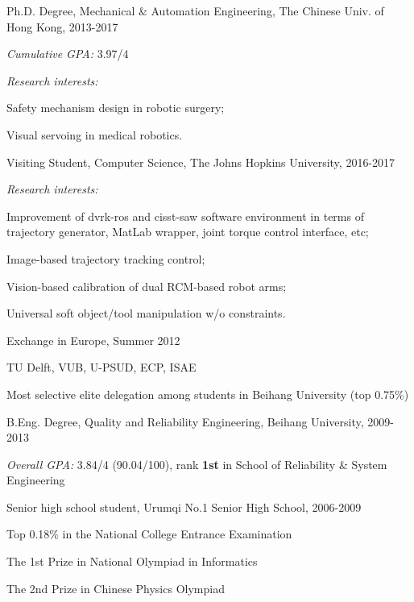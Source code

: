 \documentclass[10pt,letterpaper]{article}
\renewenvironment{itemize}{
\begin{list}{}{
    \setlength{\leftmargin}{1.5em}
    \setlength{\itemsep}{0.25em}
    \setlength{\parskip}{0pt}
    \setlength{\parsep}{0.25em}
    }
    }{
\end{list}
}
\begin{document}
\begin{itemize}
    \item Ph.D. Degree, Mechanical \& Automation Engineering, The Chinese Univ. of Hong Kong, 2013-2017
    \begin{itemize}
        \item \emph{Cumulative GPA:} 3.97/4
        \item \emph{Research interests:}
        \begin{itemize}
            \item Safety mechanism design in robotic surgery;
            \item Visual servoing in medical robotics.
        \end{itemize}
    \end{itemize}
    \item Visiting Student, Computer Science, The Johns Hopkins University, 2016-2017
    \begin{itemize}
        \item \emph{Research interests:}
        \begin{itemize}
            \item Improvement of dvrk-ros and cisst-saw software environment in terms of trajectory generator, MatLab wrapper, joint torque control interface, etc;
            \item Image-based trajectory tracking control;
            \item Vision-based calibration of dual RCM-based robot arms;
            \item Universal soft object/tool manipulation w/o constraints.
        \end{itemize}
    \end{itemize}
    \item Exchange in Europe, Summer 2012
    \begin{itemize}
        \item TU Delft, VUB, U-PSUD, ECP, ISAE
        \item Most selective elite delegation among students in Beihang University (top 0.75\%)
    \end{itemize}
    \item B.Eng. Degree, Quality and Reliability Engineering, Beihang University, 2009-2013
    \begin{itemize}
        \item \emph{Overall GPA:} 3.84/4 (90.04/100), rank \textbf{1st} in School of Reliability \& System Engineering
    \end{itemize}
    \item Senior high school student, Urumqi No.1 Senior High School, 2006-2009
    \begin{itemize}
        \item Top 0.18\% in the National College Entrance Examination
        \item The 1st Prize in National Olympiad in Informatics
        \item The 2nd Prize in Chinese Physics Olympiad
    \end{itemize}
\end{itemize}
\end{document}
